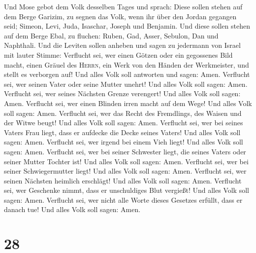  Und Mose gebot dem Volk desselben Tages und sprach:
 Diese sollen stehen auf dem Berge Garizim, zu segnen das
Volk, wenn ihr über den Jordan gegangen seid; Simeon, Levi, Juda,
Isaschar, Joseph und Benjamin.  Und diese sollen stehen
auf dem Berge Ebal, zu fluchen: Ruben, Gad, Asser, Sebulon, Dan und
Naphthali.  Und die Leviten sollen anheben und sagen zu
jedermann von Israel mit lauter Stimme:  Verflucht sei,
wer einen Götzen oder ein gegossenes Bild macht, einen Gräuel des
\textsc{Herrn}, ein Werk von den Händen der Werkmeister, und stellt es
verborgen auf! Und alles Volk soll antworten und sagen: Amen.
 Verflucht sei, wer seinen Vater oder seine Mutter
unehrt! Und alles Volk soll sagen: Amen.  Verflucht sei,
wer seines Nächsten Grenze verengert! Und alles Volk soll sagen: Amen.
 Verflucht sei, wer einen Blinden irren macht auf dem
Wege! Und alles Volk soll sagen: Amen.  Verflucht sei,
wer das Recht des Fremdlings, des Waisen und der Witwe beugt! Und alles
Volk soll sagen: Amen.  Verflucht sei, wer bei seines
Vaters Frau liegt, dass er aufdecke die Decke seines Vaters! Und alles
Volk soll sagen: Amen.  Verflucht sei, wer irgend bei
einem Vieh liegt! Und alles Volk soll sagen: Amen. 
Verflucht sei, wer bei seiner Schwester liegt, die seines Vaters oder
seiner Mutter Tochter ist! Und alles Volk soll sagen: Amen.
 Verflucht sei, wer bei seiner Schwiegermutter liegt! Und
alles Volk soll sagen: Amen.  Verflucht sei, wer seinen
Nächsten heimlich erschlägt! Und alles Volk soll sagen: Amen.
 Verflucht sei, wer Geschenke nimmt, dass er unschuldiges
Blut vergießt! Und alles Volk soll sagen: Amen. 
Verflucht sei, wer nicht alle Worte dieses Gesetzes erfüllt, dass er
danach tue! Und alles Volk soll sagen: Amen.

\hypertarget{section-27}{%
\section{28}\label{section-27}}


